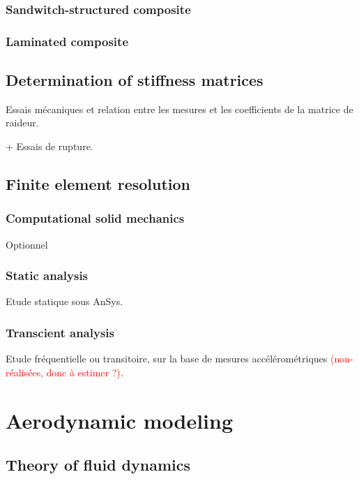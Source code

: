 \documentclass{article}
\begin{document}
\subsubsection{Sandwitch-structured composite}

\subsubsection{Laminated composite}

\subsection{Determination of stiffness matrices}

Essais mécaniques et relation entre les mesures et les coefficients de la matrice de raideur.

+ Essais de rupture.

\subsection{Finite element resolution}

\subsubsection{Computational solid mechanics}

Optionnel

\subsubsection{Static analysis}

Etude statique sous AnSys.

\subsubsection{Transcient analysis}

Etude fréquentielle ou transitoire, sur la base de mesures accélérométriques \textcolor{red}{(non-réalisées, donc à estimer ?)}.

\section{Aerodynamic modeling}

\subsection{Theory of fluid dynamics}
\end{document}
